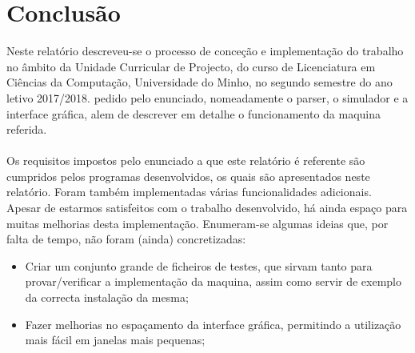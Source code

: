 \documentclass{report}
\begin{document}
\chapter{Conclusão} \label{concl}
\quad Neste relatório descreveu-se o processo de conceção e implementação do trabalho no
âmbito da Unidade Curricular de Projecto, do curso de Licenciatura em Ciências da Computação, Universidade do Minho, no
segundo semestre do ano letivo 2017/2018. pedido pelo
enunciado, nomeadamente o parser, o simulador e a interface gráfica, alem de descrever em detalhe
o funcionamento da maquina referida.\\\\
\null\quad Os requisitos impostos pelo enunciado a que este relatório é referente são cumpridos pelos programas desenvolvidos,
os quais são apresentados neste relatório. Foram também implementadas várias funcionalidades adicionais.\\
\null\quad Apesar de estarmos satisfeitos com o trabalho desenvolvido, há ainda espaço para muitas
melhorias desta implementação. Enumeram-se algumas ideias que, por falta de tempo, não foram
(ainda) concretizadas:

\begin{itemize}
\item Criar um conjunto grande de ficheiros de testes, que sirvam tanto para provar/verificar a
implementação da maquina, assim como servir de exemplo da correcta instalação da mesma;
\item Fazer melhorias no espaçamento da interface gráfica, permitindo a utilização mais fácil em janelas mais pequenas;
\end{itemize}



\end{document}
